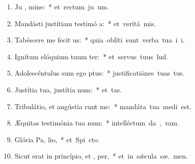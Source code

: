 \begin{flushleft}
\begin{enumerate}[leftmargin=*]


\item Ju , mine:~* \mbox{et rectum ju um.}
\item Mandásti justítiam testimó a:~* \mbox{et veritá  mis.}
\item Tabéscere me fecit  us:~* \mbox{quia oblíti sunt verba tua i i.}
\item Ignítum elóquium tuum ter:~* \mbox{et servus tuus  lud.}
\item Adolescéntulus sum ego  ptus:~* \mbox{justificatiónes tuas   tus.}
\item Justítia tua, justítia  num:~* \mbox{et   tas.}
\item Tribulátio, et angústia runt me:~* \mbox{mandáta tua medi  est.}
\item Æquitas testimónia tua  num:~* \mbox{intelléctum da ,  vam.}
\item Glória Pa,  lio,~* \mbox{et Spi cto.}
\item Sicut erat in princípio, et ,  per,~* \mbox{et in s\'{\ae}cula sæ. men.}



\end{enumerate}
\end{flushleft}

